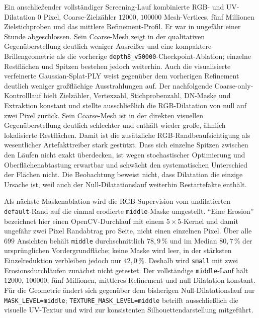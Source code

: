 \documentclass[12pt,a4paper]{article}
\begin{document}
Ein anschließender vollständiger Screening-Lauf kombinierte RGB- und UV-Dilatation $0$ Pixel, Coarse-Zielzähler $12000$, $100000$ Mesh-Vertices, fünf Millionen Zielstichproben und das mittlere Refinement-Profil. Er war in ungefähr einer Stunde abgeschlossen. Sein Coarse-Mesh zeigt in der qualitativen Gegenüberstellung deutlich weniger Ausreißer und eine kompaktere Brillengeometrie als die vorherige \texttt{depth8\_v50000}-Checkpoint-Ablation; einzelne Restflächen und Spitzen bestehen jedoch weiterhin. Auch die visualisierte verfeinerte Gaussian-Splat-PLY weist gegenüber dem vorherigen Refinement deutlich weniger großflächige Ausstrahlungen auf. Der nachfolgende Coarse-only-Kontrolllauf hielt Zielzähler, Vertexzahl, Stichprobenzahl, DN-Maske und Extraktion konstant und stellte ausschließlich die RGB-Dilatation von null auf zwei Pixel zurück. Sein Coarse-Mesh ist in der direkten visuellen Gegenüberstellung deutlich schlechter und enthält wieder große, ähnlich lokalisierte Restflächen. Damit ist die zusätzliche RGB-Randbeaufsichtigung als wesentlicher Artefakttreiber stark gestützt. Dass sich einzelne Spitzen zwischen den Läufen nicht exakt überdecken, ist wegen stochastischer Optimierung und Oberflächenabtastung erwartbar und schwächt den systematischen Unterschied der Flächen nicht. Die Beobachtung beweist nicht, dass Dilatation die einzige Ursache ist, weil auch der Null-Dilatationslauf weiterhin Restartefakte enthält.

Als nächste Maskenablation wird die RGB-Supervision vom undilatierten \texttt{default}-Rand auf die einmal erodierte \texttt{middle}-Maske umgestellt. ``Eine Erosion'' bezeichnet hier einen OpenCV-Durchlauf mit einem $5\times5$-Kernel und damit ungefähr zwei Pixel Randabtrag pro Seite, nicht einen einzelnen Pixel. Über alle $699$ Ansichten behält \texttt{middle} durchschnittlich $78{,}9\,\%$ und im Median $80{,}7\,\%$ der ursprünglichen Vordergrundfläche; keine Maske wird leer, in der stärksten Einzelreduktion verbleiben jedoch nur $42{,}0\,\%$. Deshalb wird \texttt{small} mit zwei Erosionsdurchläufen zunächst nicht getestet. Der vollständige \texttt{middle}-Lauf hält $12000$, $100000$, fünf Millionen, mittleres Refinement und null Dilatation konstant. Für die Geometrie ändert sich gegenüber dem bisherigen Null-Dilatationslauf nur \texttt{MASK\_LEVEL=middle}; \texttt{TEXTURE\_MASK\_LEVEL=middle} betrifft ausschließlich die visuelle UV-Textur und wird zur konsistenten Silhouettendarstellung mitgeführt.
\end{document}
